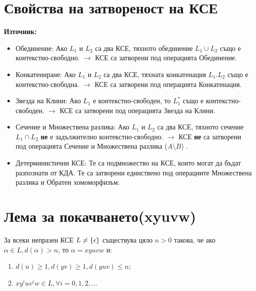 \documentclass[11pt]{article} %
\begin{document}
{\section{Свойства на затвореност на КСЕ}
\textbf{Източник: }\\
\begin{itemize}
	\item Обединение: Ако $L_{1}$ и $L_{2}$ са два КСЕ, тяхното обединение $L_{1} \cup L_{2}$ също е контекстно-свободно. $\rightarrow$ КСЕ са затворени под операцията Обединение. \\
	\item Конкатениране:  Ако $L_{1}$ и $L_{2}$ са два КСЕ, тяхната конкатенация $L_{1}.L_{2}$ също е контекстно-свободна. $\rightarrow$ КСЕ са затворени под операцията Конкатенация. \\
	\item Звезда на Клини: Ако $L_{1}$ е контекстно-свободен, то $L_{1}^{*}$ също е контекстно-свободен. $\rightarrow$ КСЕ са затворени под операцията Звезда на Клини. \\
	\item Сечение и Множествена разлика: Ако $L_{1}$ и $L_{2}$ са два КСЕ, тяхното сечение $L_{1} \cap L_{2}$ \textbf{не} е задължително контекстно-свободно. $\rightarrow$ КСЕ \textbf{не} са затворени под операцията Сечение и Множествена разлика ($A \setminus B$) . \\
	\item Детерминистични КСЕ: Те са подмножество на КСЕ, които могат да бъдат разпознати от КДА. Те са затворени единствено под операциите Множествена разлика и Обратен хомоморфизъм.  
\end{itemize}

\section{Лема за покачването(xyuvw)}
\theorem {} За всеки непразен КСЕ $L \neq \{\epsilon\}$ съществува цяло $n > 0$ такова, че ако $\alpha \in L, d(\alpha) > n$, то $\alpha = xyuvw$ и:

\enumNum
\begin{enumerate}
	\item $d(u) \geq 1, d(yv) \geq 1, d(yuv) \leq n$;\\
	\item $xy^{i}uv^{i}w \in L, \forall i = 0, 1, 2, ...$\\
\end{enumerate}

}
\end{document}
